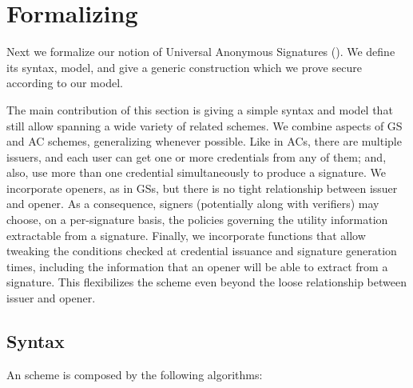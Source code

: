 \section{Formalizing \UAS}
\label{sec:formal-uas}


Next we formalize our notion of Universal Anonymous Signatures
(\UAS). We define its syntax, model, and give a generic construction which
we prove secure according to our model. 

The main contribution of this section is giving a simple syntax and model that
still allow spanning a wide variety of related schemes. We combine aspects of GS
and AC schemes, generalizing whenever possible. Like in ACs, there are multiple
issuers, and each user can get one or more credentials from any of them; and,
also, use more than one credential simultaneously to produce a signature. We
incorporate openers, as in GSs, but there is no tight relationship between
issuer and opener. As a consequence, signers (potentially along with verifiers)
may choose, on a per-signature basis, the policies governing the utility
information extractable from a signature. Finally, we incorporate functions that
allow tweaking the conditions checked at credential issuance and signature
generation times, including the information that an opener will be able to
extract from a signature. This flexibilizes the scheme even beyond the loose
relationship between issuer and opener.

\subsection{Syntax}
\label{ssec:syntax-uas}

An \UAS scheme is composed by the following algorithms:

